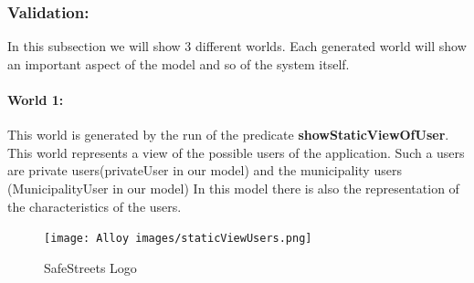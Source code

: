 \documentclass[titlepage]{article}
\begin{document}
\subsubsection{Validation:}
In this subsection we will show 3 different worlds. Each generated world will show an important aspect of the model and so of the system itself.

\paragraph{World 1: \\}
This world is generated by the run of the  predicate \textbf{showStaticViewOfUser}. This world represents a view of the possible users of the application. Such a users are private users(privateUser in our model) and the municipality users (MunicipalityUser in our model) In this model there is also the representation of the characteristics of the users.
\newpage
\begin{figure}[h]
	\texttt{[image: Alloy images/staticViewUsers.png]}
	\centering
	\caption{SafeStreets Logo}
\end{figure}
\FloatBarrier
\end{document}
